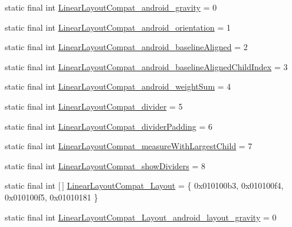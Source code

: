 \begin{DoxyCompactItemize}
\item 
static final int \mbox{\hyperlink{classcom_1_1google_1_1android_1_1gms_1_1R_1_1styleable_aa532d7a9f530605775cdbd1c522565b7}{Linear\+Layout\+Compat\+\_\+android\+\_\+gravity}} = 0
\item 
static final int \mbox{\hyperlink{classcom_1_1google_1_1android_1_1gms_1_1R_1_1styleable_ad8f0e75b058a82e14522f3725378e755}{Linear\+Layout\+Compat\+\_\+android\+\_\+orientation}} = 1
\item 
static final int \mbox{\hyperlink{classcom_1_1google_1_1android_1_1gms_1_1R_1_1styleable_a3623a4aff0e2fdebb8c1c96d5982a385}{Linear\+Layout\+Compat\+\_\+android\+\_\+baseline\+Aligned}} = 2
\item 
static final int \mbox{\hyperlink{classcom_1_1google_1_1android_1_1gms_1_1R_1_1styleable_af8df8faef6ff7f98e9b949fe87c8e339}{Linear\+Layout\+Compat\+\_\+android\+\_\+baseline\+Aligned\+Child\+Index}} = 3
\item 
static final int \mbox{\hyperlink{classcom_1_1google_1_1android_1_1gms_1_1R_1_1styleable_a9491ec3db7efe3365b5fb9cb0d780d5b}{Linear\+Layout\+Compat\+\_\+android\+\_\+weight\+Sum}} = 4
\item 
static final int \mbox{\hyperlink{classcom_1_1google_1_1android_1_1gms_1_1R_1_1styleable_a8b384448319d0237a272aca689c57e38}{Linear\+Layout\+Compat\+\_\+divider}} = 5
\item 
static final int \mbox{\hyperlink{classcom_1_1google_1_1android_1_1gms_1_1R_1_1styleable_ad8a0bae3e9d0b0750ffde4ed0e606c51}{Linear\+Layout\+Compat\+\_\+divider\+Padding}} = 6
\item 
static final int \mbox{\hyperlink{classcom_1_1google_1_1android_1_1gms_1_1R_1_1styleable_a5e10127add08e5b31579f59d8be0d110}{Linear\+Layout\+Compat\+\_\+measure\+With\+Largest\+Child}} = 7
\item 
static final int \mbox{\hyperlink{classcom_1_1google_1_1android_1_1gms_1_1R_1_1styleable_a614273a007a3ea5706f26ed9351f9206}{Linear\+Layout\+Compat\+\_\+show\+Dividers}} = 8
\item 
static final int \mbox{[}$\,$\mbox{]} \mbox{\hyperlink{classcom_1_1google_1_1android_1_1gms_1_1R_1_1styleable_ae26bc87c54b9b35a0fe1a7fc66cb384f}{Linear\+Layout\+Compat\+\_\+\+Layout}} = \{ 0x010100b3, 0x010100f4, 0x010100f5, 0x01010181 \}
\item 
static final int \mbox{\hyperlink{classcom_1_1google_1_1android_1_1gms_1_1R_1_1styleable_a5e97ac7a44c55a0d6046356df3895652}{Linear\+Layout\+Compat\+\_\+\+Layout\+\_\+android\+\_\+layout\+\_\+gravity}} = 0

\end{DoxyCompactItemize}

